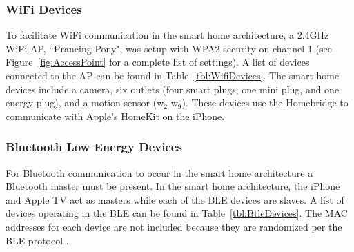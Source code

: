 \subsubsection{WiFi Devices}

To facilitate WiFi communication in the smart home architecture, a 2.4GHz WiFi \ac{AP}, ``Prancing Pony", was setup with WPA2 security on channel 1 (see Figure~\ref{fig:AccessPoint} for a complete list of settings). A list of devices connected to the \ac{AP} can be found in Table~\ref{tbl:WifiDevices}. The smart home devices include a camera, six outlets (four smart plugs, one mini plug, and one energy plug), and a motion sensor (w$ _2 $-w$ _9 $). These devices use the Homebridge to communicate with Apple's HomeKit on the iPhone. 

\figAccessPoint

\tableWifiDevices

\subsubsection{Bluetooth Low Energy Devices}

For Bluetooth communication to occur in the smart home architecture a Bluetooth master must be present. In the smart home architecture, the iPhone and Apple TV act as masters while each of the \ac{BLE} devices are slaves. A list of devices operating in the \ac{BLE} can be found in Table~\ref{tbl:BtleDevices}. The \ac{MAC} addresses for each device are not included because they are randomized per the \ac{BLE} protocol \cite{sig4.2}.

\tableBtleDevices